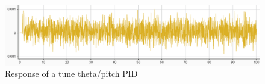 \begin{figure}[H]
    \begin{center}
    \includegraphics[scale=0.7]{pictures/control/thetaPID.PNG}
    \end{center}
    \caption{Response of a tune theta/pitch PID}
    \label{fig:thetapid}
\end{figure}